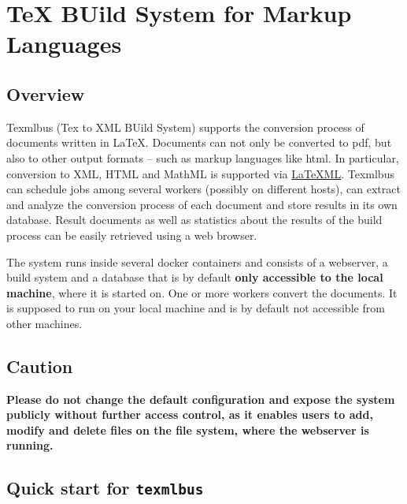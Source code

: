 \documentclass[a4paper]{article}
\title{\vtitle}
\author{Heinrich Stamerjohanns}
\date{2021-04-25}
\newcommand{\texmlbus}{\texttt{texmlbus}}
\newcommand{\latex}{\LaTeX{}}
\begin{document}
\maketitle

\section{TeX BUild System for Markup Languages}

\subsection{Overview}
Texmlbus (Tex to XML BUild System) supports the conversion process of documents written in \latex .
Documents can not only be converted to pdf, but also to other output formats -- such as markup languages like html. In particular, conversion to XML, HTML and MathML is supported via \href{https://dlmf.nist.gov/LaTeXML/}{LaTeXML}. Texmlbus can schedule jobs among several workers (possibly on different hosts), can extract and analyze the conversion process of each document and store results in its own database. Result documents as well as statistics about the results of the build process can be easily retrieved using a web browser.

The system runs inside several docker containers and consists of a webserver, a build system and a database that is by default \textbf{only accessible to the local machine}, where it is started on. One or more workers convert the documents. It is supposed to run on your local machine and is by default not accessible from other machines.

\begin{shaded}
\subsection*{Caution}
\textbf{Please do not change the default configuration and expose the system publicly without further access control, as it enables users to add, modify and delete files on the file system, where the webserver is running.} 
\end{shaded}

\subsection{Quick start for \texmlbus}
\end{document}
